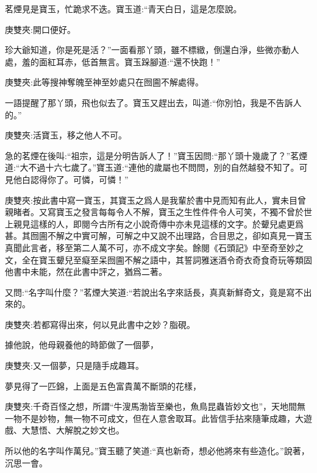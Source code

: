 \begin{parag}
    茗煙見是寶玉，忙跪求不迭。寶玉道:“青天白日，這是怎麼說。\begin{note}庚雙夾:開口便好。\end{note}珍大爺知道，你是死是活？”一面看那丫頭，雖不標緻，倒還白淨，些微亦動人處，羞的面紅耳赤，低首無言。寶玉跺腳道:“還不快跑！”\begin{note}庚雙夾:此等搜神奪魄至神至妙處只在囫圇不解處得。\end{note}一語提醒了那丫頭，飛也似去了。寶玉又趕出去，叫道:“你別怕，我是不告訴人的。”\begin{note}庚雙夾:活寶玉，移之他人不可。\end{note}急的茗煙在後叫:“祖宗，這是分明告訴人了！”寶玉因問:“那丫頭十幾歲了？”茗煙道:“大不過十六七歲了。”寶玉道:“連他的歲屬也不問問，別的自然越發不知了。可見他白認得你了。可憐，可憐！”\begin{note}庚雙夾:按此書中寫一寶玉，其寶玉之爲人是我輩於書中見而知有此人，實未目曾親睹者。又寫寶玉之發言每每令人不解，寶玉之生性件件令人可笑，不獨不曾於世上親見這樣的人，即閱今古所有之小說奇傳中亦未見這樣的文字。於顰兒處更爲甚。其囫圇不解之中實可解，可解之中又說不出理路，合目思之，卻如真見一寶玉真聞此言者，移至第二人萬不可，亦不成文字矣。餘閱《石頭記》中至奇至妙之文，全在寶玉顰兒至癡至呆囫圇不解之語中，其誓詞雅迷酒令奇衣奇食奇玩等類固他書中未能，然在此書中評之，猶爲二著。\end{note}又問:“名字叫什麼？”茗煙大笑道:“若說出名字來話長，真真新鮮奇文，竟是寫不出來的。\begin{note}庚雙夾:若都寫得出來，何以見此書中之妙？脂硯。\end{note}據他說，他母親養他的時節做了一個夢，\begin{note}庚雙夾:又一個夢，只是隨手成趣耳。\end{note}夢見得了一匹錦，上面是五色富貴萬不斷頭的花樣，\begin{note}庚雙夾:千奇百怪之想，所謂“牛溲馬渤皆至樂也，魚鳥昆蟲皆妙文也”，天地間無一物不是妙物，無一物不可成文，但在人意舍取耳。此皆信手拈來隨筆成趣，大遊戲、大慧悟、大解脫之妙文也。\end{note}所以他的名字叫作萬兒。”寶玉聽了笑道:“真也新奇，想必他將來有些造化。”說著，沉思一會。
\end{parag}


